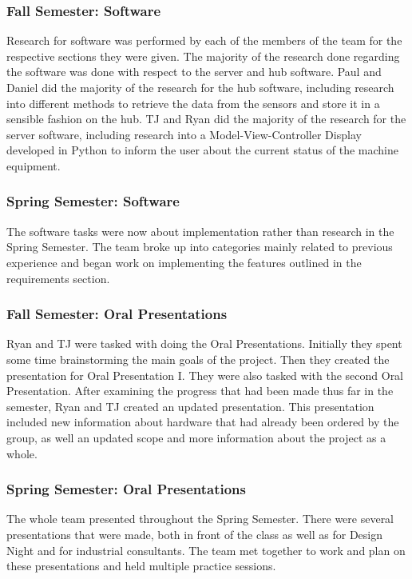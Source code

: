 \documentclass[PPFS.tex]{template/subfiles}
\begin{document}
\subsubsection{Fall Semester: Software}
Research for software was performed by each of the members of the team for the respective sections they were given. The majority of the research done regarding the software was done with respect to the server and hub software. Paul and Daniel did the majority of the research for the hub software, including research into different methods to retrieve the data from the sensors and store it in a sensible fashion on the hub. TJ and Ryan did the majority of the research for the server software, including research into a Model-View-Controller Display developed in Python to inform the user about the current status of the machine equipment.

\subsubsection{Spring Semester: Software}
The software tasks were now about implementation rather than research in the Spring Semester. The team broke up into categories mainly related to previous experience and began work on implementing the features outlined in the requirements section.

\subsubsection{Fall Semester: Oral Presentations}
Ryan and TJ were tasked with doing the Oral Presentations. Initially they spent some time brainstorming the main goals of the project. Then they created the presentation for Oral Presentation I. They were also tasked with the second Oral Presentation. After examining the progress that had been made thus far in the semester, Ryan and TJ created an updated presentation. This presentation included new information about hardware that had already been ordered by the group, as well an updated scope and more information about the project as a whole.

\subsubsection{Spring Semester: Oral Presentations}
The whole team presented throughout the Spring Semester. There were several presentations that were made, both in front of the class as well as for Design Night and for industrial consultants. The team met together to work and plan on these presentations and held multiple practice sessions.
\end{document}
